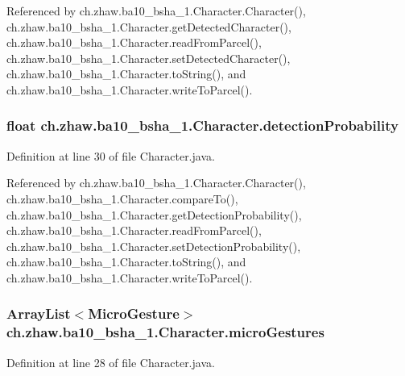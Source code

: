 Referenced by ch.zhaw.ba10\_\-bsha\_\-1.Character.Character(), ch.zhaw.ba10\_\-bsha\_\-1.Character.getDetectedCharacter(), ch.zhaw.ba10\_\-bsha\_\-1.Character.readFromParcel(), ch.zhaw.ba10\_\-bsha\_\-1.Character.setDetectedCharacter(), ch.zhaw.ba10\_\-bsha\_\-1.Character.toString(), and ch.zhaw.ba10\_\-bsha\_\-1.Character.writeToParcel().\hypertarget{classch_1_1zhaw_1_1ba10__bsha__1_1_1Character_af797c21f650fd10789f7c00bda6418c8}{
\subsubsection[{detectionProbability}]{\setlength{\rightskip}{0pt plus 5cm}float {\bf ch.zhaw.ba10\_\-bsha\_\-1.Character.detectionProbability}}}
\label{classch_1_1zhaw_1_1ba10__bsha__1_1_1Character_af797c21f650fd10789f7c00bda6418c8}


Definition at line 30 of file Character.java.

Referenced by ch.zhaw.ba10\_\-bsha\_\-1.Character.Character(), ch.zhaw.ba10\_\-bsha\_\-1.Character.compareTo(), ch.zhaw.ba10\_\-bsha\_\-1.Character.getDetectionProbability(), ch.zhaw.ba10\_\-bsha\_\-1.Character.readFromParcel(), ch.zhaw.ba10\_\-bsha\_\-1.Character.setDetectionProbability(), ch.zhaw.ba10\_\-bsha\_\-1.Character.toString(), and ch.zhaw.ba10\_\-bsha\_\-1.Character.writeToParcel().\hypertarget{classch_1_1zhaw_1_1ba10__bsha__1_1_1Character_a3a665125fd44a0f4b65330f0dfa72bfe}{
\subsubsection[{microGestures}]{\setlength{\rightskip}{0pt plus 5cm}ArrayList$<${\bf MicroGesture}$>$ {\bf ch.zhaw.ba10\_\-bsha\_\-1.Character.microGestures}}}
\label{classch_1_1zhaw_1_1ba10__bsha__1_1_1Character_a3a665125fd44a0f4b65330f0dfa72bfe}


Definition at line 28 of file Character.java.

